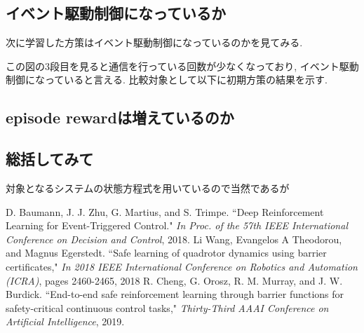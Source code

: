 \documentclass{jsarticle}
\begin{document}
\subsection{イベント駆動制御になっているか}
次に学習した方策はイベント駆動制御になっているのかを見てみる. \par
この図の3段目を見ると通信を行っている回数が少なくなっており, イベント駆動制御になっていると言える. 比較対象として以下に初期方策の結果を示す. 

\subsection{episode rewardは増えているのか}

\subsection{総括してみて}
対象となるシステムの状態方程式を用いているので当然であるが


\begin{thebibliography}{10}
D. Baumann, J. J. Zhu, G. Martius, and S. Trimpe. “Deep Reinforcement Learning for Event-Triggered Control."  \textit{In Proc. of the 57th IEEE International Conference on Decision and Control}, 2018.
Li Wang, Evangelos A Theodorou, and Magnus Egerstedt. “Safe learning of quadrotor dynamics using barrier certificates," \textit{In 2018 IEEE International Conference on Robotics and Automation (ICRA)}, pages 2460-2465, 2018
R. Cheng, G. Orosz, R. M. Murray, and J. W. Burdick.  “End-to-end safe reinforcement learning through barrier functions for safety-critical continuous control tasks," \textit{Thirty-Third AAAI Conference on Artificial Intelligence}, 2019.

\end{thebibliography}

 
\end{document}
